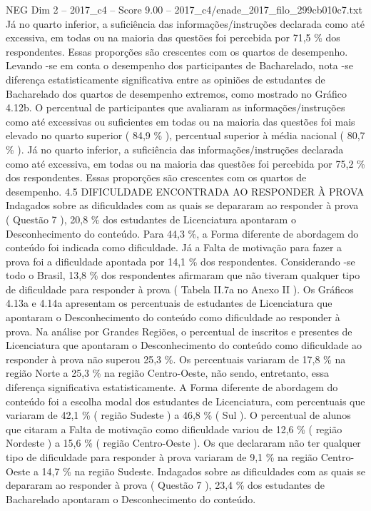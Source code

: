 \begin{textsample}{NEG Dim 2 – 2017\_c4 – Score 9.00 – 2017\_c4/enade\_2017\_filo\_299cb010c7.txt}
Já no quarto inferior, a suficiência das informações/instruções declarada como até excessiva, em todas ou na maioria das questões foi percebida por 71,5 \% dos respondentes.
Essas proporções são crescentes com os quartos de desempenho.
Levando -se em conta o desempenho dos participantes de Bacharelado, nota -se diferença estatisticamente significativa entre as opiniões de estudantes de Bacharelado dos quartos de desempenho extremos, como mostrado no Gráfico 4.12b.
O percentual de participantes que avaliaram as informações/instruções como até excessivas ou suficientes em todas ou na maioria das questões foi mais elevado no quarto superior ( 84,9 \% ), percentual superior à média nacional ( 80,7 \% ).
Já no quarto inferior, a suficiência das informações/instruções declarada como até excessiva, em todas ou na maioria das questões foi percebida por 75,2 \% dos respondentes.
Essas proporções são crescentes com os quartos de desempenho. 4.5 DIFICULDADE ENCONTRADA AO RESPONDER À PROVA Indagados sobre as dificuldades com as quais se depararam ao responder à prova ( Questão 7 ), 20,8 \% dos estudantes de Licenciatura apontaram o Desconhecimento do conteúdo.
Para 44,3 \%, a Forma diferente de abordagem do conteúdo foi indicada como dificuldade.
Já a Falta de motivação para fazer a prova foi a dificuldade apontada por 14,1 \% dos respondentes.
Considerando -se todo o Brasil, 13,8 \% dos respondentes afirmaram que não tiveram qualquer tipo de dificuldade para responder à prova ( Tabela II.7a no Anexo II ).
Os Gráficos 4.13a e 4.14a apresentam os percentuais de estudantes de Licenciatura que apontaram o Desconhecimento do conteúdo como dificuldade ao responder à prova.
Na análise por Grandes Regiões, o percentual de inscritos e presentes de Licenciatura que apontaram o Desconhecimento do conteúdo como dificuldade ao responder à prova não superou 25,3 \%.
Os percentuais variaram de 17,8 \% na região Norte a 25,3 \% na região Centro-Oeste, não sendo, entretanto, essa diferença significativa estatisticamente.
A Forma diferente de abordagem do conteúdo foi a escolha modal dos estudantes de Licenciatura, com percentuais que variaram de 42,1 \% ( região Sudeste ) a 46,8 \% ( Sul ).
O percentual de alunos que citaram a Falta de motivação como dificuldade variou de 12,6 \% ( região Nordeste ) a 15,6 \% ( região Centro-Oeste ).
Os que declararam não ter qualquer tipo de dificuldade para responder à prova variaram de 9,1 \% na região Centro-Oeste a 14,7 \% na região Sudeste.
Indagados sobre as dificuldades com as quais se depararam ao responder à prova ( Questão 7 ), 23,4 \% dos estudantes de Bacharelado apontaram o Desconhecimento do conteúdo.

\end{textsample}
